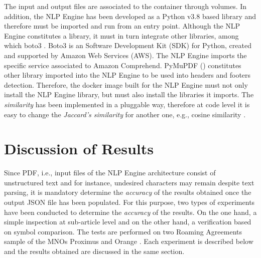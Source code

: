\documentclass[conference]{style/IEEEtran}
\begin{document}
The input and output files are associated to the container through volumes. In addition, the NLP Engine has been developed as a Python v3.8 based library and therefore must be imported and run from an entry point. Although the NLP Engine constitutes a library, it must in turn integrate other libraries, among which boto3 \cite{boto3}. Boto3 is an Software Development Kit (SDK) for Python, created and supported by Amazon Web Services (AWS). The NLP Engine imports the specific service associated to Amazon Comprehend. PyMuPDF (\cite{PyMuPDF}) constitutes other library imported into the NLP Engine to be used into headers and footers detection. Therefore, the docker image built for the NLP Engine must not only install the NLP Engine library, but must also install the libraries it imports. The \textit{similarity} has been implemented in a pluggable way, therefore at code level it is easy to change the \textit{Jaccard's similarity} for another one, e.g., cosine similarity \cite{Gupta2018}.

\section{Discussion of Results}
Since PDF, i.e., input files of the NLP Engine architecture consist of unstructured text and for instance, undesired characters may remain despite text parsing, it is mandatory determine the \textit{accuracy} of the results obtained once the output JSON file has been populated. For this purpose, two types of experiments have been conducted to determine the \textit{accuracy} of the results. On the one hand, a simple inspection at sub-article level and on the other hand, a verification based on symbol comparison. The tests are performed on two Roaming Agreements sample of the MNOs Proximus and Orange \cite{proximus}. Each experiment is described below and the results obtained are discussed in the same section.
\end{document}
